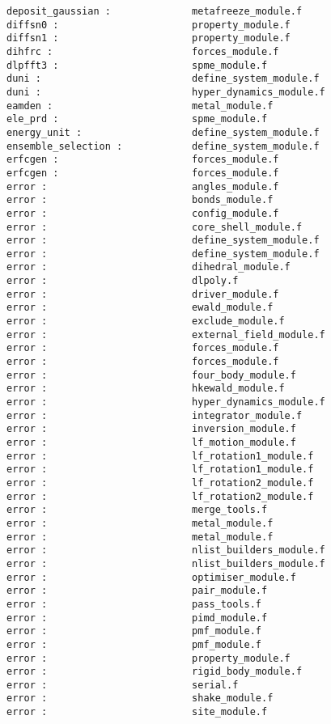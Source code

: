\begin{verbatim}
deposit_gaussian :              metafreeze_module.f
diffsn0 :                       property_module.f
diffsn1 :                       property_module.f
dihfrc :                        forces_module.f
dlpfft3 :                       spme_module.f
duni :                          define_system_module.f 
duni :                          hyper_dynamics_module.f 
eamden :                        metal_module.f
ele_prd :                       spme_module.f
energy_unit :                   define_system_module.f 
ensemble_selection :            define_system_module.f
erfcgen :                       forces_module.f
erfcgen :                       forces_module.f
error :                         angles_module.f
error :                         bonds_module.f
error :                         config_module.f
error :                         core_shell_module.f
error :                         define_system_module.f
error :                         define_system_module.f
error :                         dihedral_module.f
error :                         dlpoly.f
error :                         driver_module.f
error :                         ewald_module.f
error :                         exclude_module.f
error :                         external_field_module.f
error :                         forces_module.f
error :                         forces_module.f
error :                         four_body_module.f
error :                         hkewald_module.f
error :                         hyper_dynamics_module.f
error :                         integrator_module.f
error :                         inversion_module.f
error :                         lf_motion_module.f
error :                         lf_rotation1_module.f
error :                         lf_rotation1_module.f
error :                         lf_rotation2_module.f
error :                         lf_rotation2_module.f
error :                         merge_tools.f
error :                         metal_module.f
error :                         metal_module.f
error :                         nlist_builders_module.f
error :                         nlist_builders_module.f
error :                         optimiser_module.f
error :                         pair_module.f
error :                         pass_tools.f
error :                         pimd_module.f
error :                         pmf_module.f
error :                         pmf_module.f
error :                         property_module.f
error :                         rigid_body_module.f
error :                         serial.f
error :                         shake_module.f
error :                         site_module.f

\end{verbatim}
